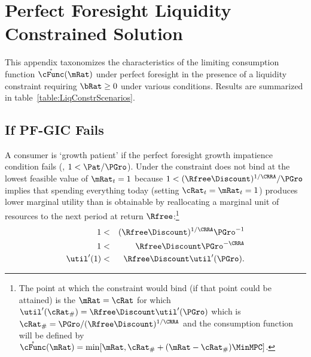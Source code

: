 \documentclass[../BufferStockTheory.tex]{subfiles}
\begin{document}
\newcommand{\FigDirApndx}{Code/Python/Figures}

\section{Perfect Foresight Liquidity Constrained Solution}\label{sec:ApndxLiqConstr}

  This appendix taxonomizes the characteristics of the limiting
  consumption function $\mathring{\cFunc}(\mRat)$ under perfect
  foresight in the presence of a liquidity constraint requiring $\bRat
  \geq 0$ under various conditions.  Results are summarized in
  table~\ref{table:LiqConstrScenarios}.



\subsection{If PF-GIC Fails}

A consumer is `growth patient' if the perfect foresight growth
impatience condition fails (, $1 < \Pat/\PGro$).  Under
 the constraint does not bind at the lowest feasible value of $\mRat_{t}=1$ because
$1 < (\Rfree\Discount)^{1/\CRRA}/\PGro$ implies that spending
everything today (setting $\cRat_{t}=\mRat_{t}=1$) produces lower
marginal utility than is obtainable by reallocating a marginal unit of
resources to the next period at return $\Rfree$:\footnote{The point at
  which the constraint would bind (if that point could be attained) is
  the $\mRat=\cRat$ for which $\util^{\prime}(\cRat_{\#}) = \Rfree
  \Discount \util^{\prime}(\PGro)$ which is $\cRat_{\#} =
  \PGro/(\Rfree \Discount)^{1/\CRRA}$ and the consumption function
  will be defined by
  $\mathring{\cFunc}(\mRat)=\min[\mRat,\cRat_{\#}+(\mRat-\cRat_{\#})\MinMPC
  ]$.}
\begin{eqnarray}
1 & < & (\Rfree \Discount)^{1/\CRRA}\PGro^{-1}   \label{eq:EulerPFGICFails}
\\ 1 & < & \Rfree \Discount \PGro^{-\CRRA}
\\  \util^{\prime}(1) & < & \Rfree \Discount \util^{\prime}(\PGro)   \label{eq:EulerPFGICFailsEnd}.
\end{eqnarray}
\end{document}
